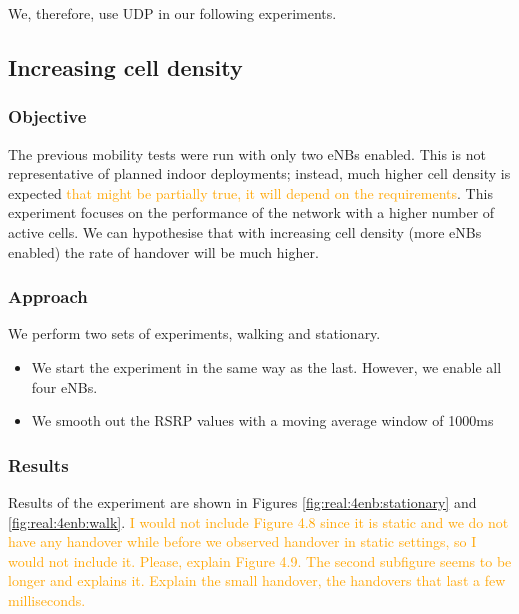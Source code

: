 We, therefore, use UDP in our following experiments.

\subsection{Increasing cell density}
\tocomplete{}

\subsubsection{Objective}
The previous mobility tests were run with only two eNBs enabled. This is not representative of planned indoor deployments; instead, much higher cell density is expected \insertref \textcolor{orange}{that might be partially true, it will depend on the requirements}. This experiment focuses on the performance of the network with a higher number of active cells. We can hypothesise that with increasing cell density (more eNBs enabled) the rate of handover will be much higher.
\subsubsection{Approach}
We perform two sets of experiments, walking and stationary.
\begin{itemize}
    \item We start the experiment in the same way as the last. However, we enable all four eNBs.
    \item We smooth out the RSRP values with a moving average window of 1000ms%
\end{itemize}
\subsubsection{Results}
Results of the experiment are shown in Figures \ref{fig:real:4enb:stationary} and \ref{fig:real:4enb:walk}. \textcolor{orange}{I would not include Figure 4.8 since it is static and we do not have any handover while before we observed handover in static settings, so I would not include it. Please, explain Figure 4.9. The second subfigure seems to be longer and explains it. Explain the small handover, the handovers that last a few milliseconds.}

